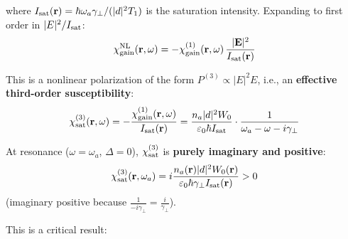 \documentclass[12pt]{article}
\begin{document}
where $I_{\rm sat}(\mathbf{r}) = \hbar\omega_a\gamma_\perp/(|d|^2 T_1)$ is
the saturation intensity.  Expanding to first order in $|E|^2/I_{\rm sat}$:
\begin{equation}
  \chi_{\rm gain}^{\rm NL}(\mathbf{r},\omega)
  = -\chi_{\rm gain}^{(1)}(\mathbf{r},\omega)\,\frac{|\mathbf{E}|^2}{I_{\rm sat}(\mathbf{r})}
  \label{eq:gain_NL}
\end{equation}

This is a nonlinear polarization of the form $P^{(3)}\propto|E|^2 E$, i.e.,
an \textbf{effective third-order susceptibility}:
\begin{equation}
  \chi^{(3)}_{\rm sat}(\mathbf{r},\omega) =
  -\frac{\chi^{(1)}_{\rm gain}(\mathbf{r},\omega)}{I_{\rm sat}(\mathbf{r})}
  = \frac{n_a|d|^2 W_0}{\varepsilon_0\hbar I_{\rm sat}}
  \cdot\frac{1}{\omega_a-\omega-i\gamma_\perp}
  \label{eq:chi3_sat}
\end{equation}

At resonance ($\omega = \omega_a$, $\Delta=0$), $\chi^{(3)}_{\rm sat}$ is
\textbf{purely imaginary and positive}:
\begin{equation}
  \chi^{(3)}_{\rm sat}(\mathbf{r},\omega_a)
  = i\frac{n_a(\mathbf{r})|d|^2 W_0(\mathbf{r})}
  {\varepsilon_0\hbar\gamma_\perp I_{\rm sat}(\mathbf{r})} > 0
  \label{eq:chi3_sat_value}
\end{equation}
(imaginary positive because $\frac{1}{-i\gamma_\perp} = \frac{i}{\gamma_\perp}$).

This is a critical result:
\end{document}
